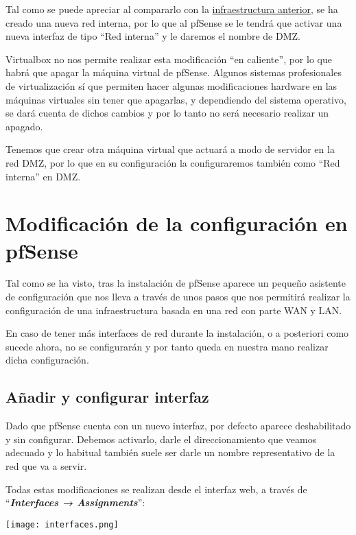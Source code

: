 Tal como se puede apreciar al compararlo con la \hyperlink{detalles_maquina_virtual}{infraestructura anterior}, se ha creado una nueva red interna, por lo que al pfSense se le tendrá que activar una nueva interfaz de tipo “Red interna” y le daremos el nombre de DMZ.

Virtualbox no nos permite realizar esta modificación “en caliente”, por lo que habrá que apagar la máquina virtual de pfSense. Algunos sistemas profesionales de virtualización sí que permiten hacer algunas modificaciones hardware en las máquinas virtuales sin tener que apagarlas, y dependiendo del sistema operativo, se dará cuenta de dichos cambios y por lo tanto no será necesario realizar un apagado.

Tenemos que crear otra máquina virtual que actuará a modo de servidor en la red DMZ, por lo que en su configuración la configuraremos también como “Red interna” en DMZ.


\section{Modificación de la configuración en pfSense}
Tal como se ha visto, tras la instalación de pfSense aparece un pequeño asistente de configuración que nos lleva a través de unos pasos que nos permitirá realizar la configuración de una infraestructura basada en una red con parte WAN y LAN.

En caso de tener más interfaces de red durante la instalación, o a posteriori como sucede ahora, no se configurarán y por tanto queda en nuestra mano realizar dicha configuración.


\subsection{Añadir y configurar interfaz}
Dado que pfSense cuenta con un nuevo interfaz, por defecto aparece deshabilitado y sin configurar. Debemos activarlo, darle el direccionamiento que veamos adecuado y lo habitual también suele ser darle un nombre representativo de la red que va a servir.

Todas estas modificaciones se realizan desde el interfaz web, a través de “\textit{\textbf{Interfaces → Assignments}}”:

\begin{center}
    \vspace{-10pt}
    \texttt{[image: interfaces.png]}
    \vspace{-20pt}
\end{center}

